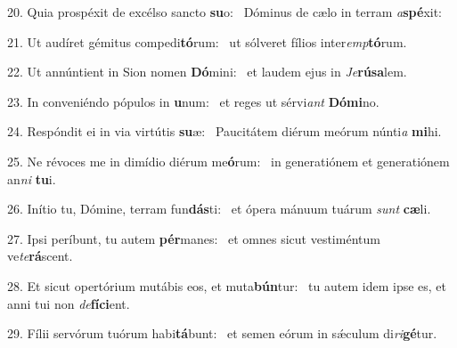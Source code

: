 20. Quia prospéxit de excélso sancto \textbf{su}o: \ast\  Dóminus de cælo in terram \textit{a}\textbf{spé}xit:\

21. Ut audíret gémitus compedi\textbf{tó}rum: \ast\  ut sólveret fílios inter\textit{emp}\textbf{tó}rum.\

22. Ut annúntient in Sion nomen \textbf{Dó}mini: \ast\  et laudem ejus in \textit{Je}\textbf{rú}\textbf{sa}lem.\

23. In conveniéndo pópulos in \textbf{u}num: \ast\  et reges ut sérvi\textit{ant} \textbf{Dó}\textbf{mi}no.\

24. Respóndit ei in via virtútis \textbf{su}æ: \ast\  Paucitátem diérum meórum núnti\textit{a} \textbf{mi}hi.\

25. Ne révoces me in dimídio diérum me\textbf{ó}rum: \ast\  in generatiónem et generatiónem an\textit{ni} \textbf{tu}i.\

26. Inítio tu, Dómine, terram fun\textbf{dás}ti: \ast\  et ópera mánuum tuárum \textit{sunt} \textbf{cæ}li.\

27. Ipsi períbunt, tu autem \textbf{pér}manes: \ast\  et omnes sicut vestiméntum ve\textit{te}\textbf{rá}scent.\

28. Et sicut opertórium mutábis eos, et muta\textbf{bún}tur: \ast\  tu autem idem ipse es, et anni tui non \textit{de}\textbf{fí}\textbf{ci}ent.\

29. Fílii servórum tuórum habi\textbf{tá}bunt: \ast\  et semen eórum in sǽculum di\textit{ri}\textbf{gé}tur.\

